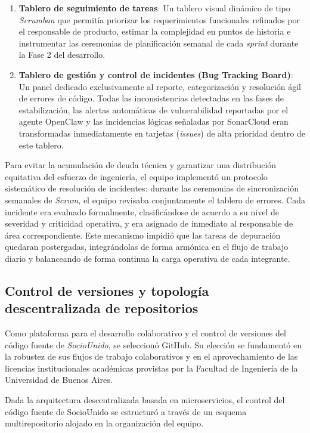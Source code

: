 \documentclass[conference, a4paper]{IEEEtran}
\begin{document}
\begin{enumerate}
    \item \textbf{Tablero de seguimiento de tareas}: Un tablero visual din\'amico de tipo \textit{Scrumban} que permit\'ia priorizar los requerimientos funcionales refinados por el responsable de producto, estimar la complejidad en puntos de historia e instrumentar las ceremonias de planificaci\'on semanal de cada \textit{sprint} durante la Fase 2 del desarrollo.
    \item \textbf{Tablero de gesti\'on y control de incidentes (Bug Tracking Board)}: Un panel dedicado exclusivamente al reporte, categorizaci\'on y resoluci\'on \'agil de errores de c\'odigo. Todas las inconsistencias detectadas en las fases de estabilizaci\'on, las alertas autom\'aticas de vulnerabilidad reportadas por el agente OpenClaw y las incidencias l\'ogicas se\~naladas por SonarCloud eran transformadas inmediatamente en tarjetas (\textit{issues}) de alta prioridad dentro de este tablero.
\end{enumerate}

Para evitar la acumulaci\'on de deuda t\'ecnica y garantizar una distribuci\'on equitativa del esfuerzo de ingenier\'ia, el equipo implement\'o un protocolo sistem\'atico de resoluci\'on de incidentes: durante las ceremonias de sincronizaci\'on semanales de \textit{Scrum}, el equipo revisaba conjuntamente el tablero de errores. Cada incidente era evaluado formalmente, clasific\'andose de acuerdo a su nivel de severidad y criticidad operativa, y era asignado de inmediato al responsable de \'area correspondiente. Este mecanismo impidi\'o que las tareas de depuraci\'on quedaran postergadas, integr\'andolas de forma arm\'onica en el flujo de trabajo diario y balanceando de forma continua la carga operativa de cada integrante.

\subsection{Control de versiones y topolog\'ia descentralizada de repositorios}
Como plataforma para el desarrollo colaborativo y el control de versiones del c\'odigo fuente de \textit{SocioUnido}, se seleccion\'o GitHub. Su elecci\'on se fundament\'o en la robustez de sus flujos de trabajo colaborativos y en el aprovechamiento de las licencias institucionales acad\'emicas provistas por la Facultad de Ingenier\'ia de la Universidad de Buenos Aires. 

Dada la arquitectura descentralizada basada en microservicios, el control del c\'odigo fuente de SocioUnido se estructur\'o a trav\'es de un esquema multirepositorio alojado en la organizaci\'on del equipo.
\end{document}
